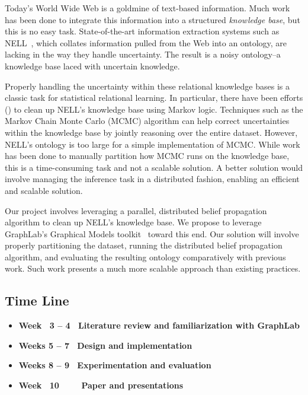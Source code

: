 Today's World Wide Web is a goldmine of text-based information.
Much work has been done to integrate this information into a structured
\emph{knowledge base}, but this is no easy task.
State-of-the-art information extraction systems such as NELL~\cite{carlson2010toward},
which collates information pulled from the Web into an ontology,
are lacking in the way they handle uncertainty.
The result is a noisy ontology--a knowledge base laced with uncertain knowledge.

Properly handling the uncertainty within these relational knowledge bases
is a classic task for statistical relational learning.
In particular, there have been efforts (\cite{lao2011random}) to clean up NELL's knowledge base
using Markov logic.
Techniques such as the Markov Chain Monte Carlo (MCMC) algorithm can help correct
uncertainties within the knowledge base by jointly reasoning over the entire dataset.
However, NELL's ontology is too large for a simple implementation of MCMC.
While work has been done to manually partition how MCMC runs on the knowledge base,
this is a time-consuming task and not a scalable solution.
A better solution would involve managing the inference task in a distributed fashion,
enabling an efficient and scalable solution.

Our project involves leveraging a parallel, distributed belief propagation algorithm
to clean up NELL's knowledge base.
We propose to leverage GraphLab's Graphical Models toolkit~\cite{low2010graphlab} toward this end.
Our solution will involve properly partitioning the dataset,
running the distributed belief propagation algorithm,
and evaluating the resulting ontology comparatively with previous work.
Such work presents a much more scalable approach than existing practices.

\subsection*{Time Line}
\begin{itemize}
\item \bf Week ~3 -- 4  \rm~Literature review and familiarization with GraphLab
\item \bf Weeks 5 -- 7  \rm~Design and implementation
\item \bf Weeks 8 -- 9  \rm~Experimentation and evaluation
\item \bf Week ~10~~~ \rm~Paper and presentations
\end{itemize}



